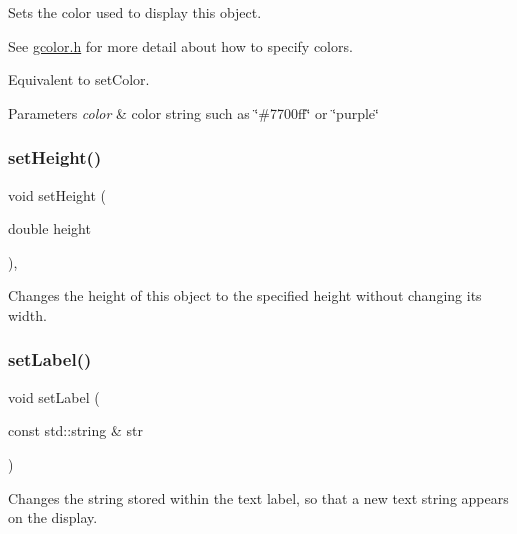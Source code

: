Sets the color used to display this object. 

See \mbox{\hyperlink{gcolor_8h_source}{gcolor.\+h}} for more detail about how to specify colors.

Equivalent to set\+Color.


\begin{DoxyParams}{Parameters}
{\em color} & color string such as \char`\"{}\#7700ff\char`\"{} or \char`\"{}purple\char`\"{} \\
\hline
\end{DoxyParams}
\mbox{\label{classsgl_1_1GObject_a9e280bfc4544dfaf8e4376c4e1a74357}} 
\subsubsection{\texorpdfstring{set\+Height()}{setHeight()}}
{\footnotesize\ttfamily void set\+Height (\begin{DoxyParamCaption}\item[{double}]{height }\end{DoxyParamCaption})\hspace{0.3cm}{\ttfamily [virtual]}, {\ttfamily [inherited]}}



Changes the height of this object to the specified height without changing its width. 

\mbox{\label{classsgl_1_1GText_a889d82f199797fea605ee8230dcd4f6f}} 
\subsubsection{\texorpdfstring{set\+Label()}{setLabel()}}
{\footnotesize\ttfamily void set\+Label (\begin{DoxyParamCaption}\item[{const std\+::string \&}]{str }\end{DoxyParamCaption})\hspace{0.3cm}{\ttfamily [virtual]}}



Changes the string stored within the text label, so that a new text string appears on the display. 

